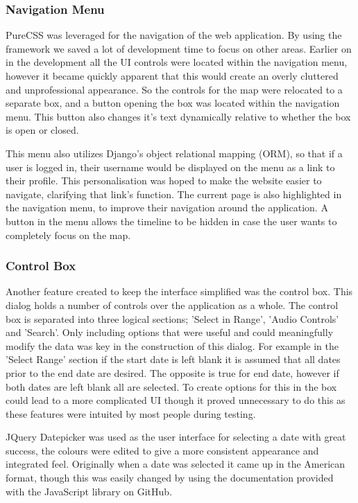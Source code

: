 \documentclass{l3proj}
\begin{document}
\subsubsection{Navigation Menu}		PureCSS was leveraged for the navigation of the web application. By using the framework we saved a lot of development time to focus on other areas. Earlier on in the development all the UI controls were located within the navigation menu, however it became quickly apparent that this would create an overly cluttered and unprofessional appearance. So the controls for the map were relocated to a separate box, and a button opening the box was located within the navigation menu. This button also changes it's text dynamically relative to whether the box is open or closed.

This menu also utilizes Django's object relational mapping (ORM), so that if a user is logged in, their username would be displayed on the menu as a link to their profile. This personalisation was hoped to make the website easier to navigate, clarifying that link's function. The current page is also highlighted in the navigation menu, to improve their navigation around the application. A button in the menu allows the timeline to be hidden in case the user wants to completely focus on the map.

\subsubsection{Control Box}		Another feature created to keep the interface simplified was the control box. This dialog holds a number of controls over the application as a whole. The control box is separated into three logical sections; 'Select in Range', 'Audio Controls' and 'Search'. Only including options that were useful and could meaningfully modify the data was key in the construction of this dialog. For example in the 'Select Range' section if the start date is left blank it is assumed that all dates prior to the end date are desired. The opposite is true for end date, however if both dates are left blank all are selected. To create options for this in the box could lead to a more complicated UI though it proved unnecessary to do this as these features were intuited by most people during testing.

\gls{JQuery} Datepicker\cite{jQueryDatepicker} was used as the user interface for selecting a date with great success, the colours were edited to give a more consistent appearance and integrated feel. Originally when a date was selected it came up in the American format, though this was easily changed by using the documentation provided with the \gls{JavaScript} library on GitHub.
\end{document}
